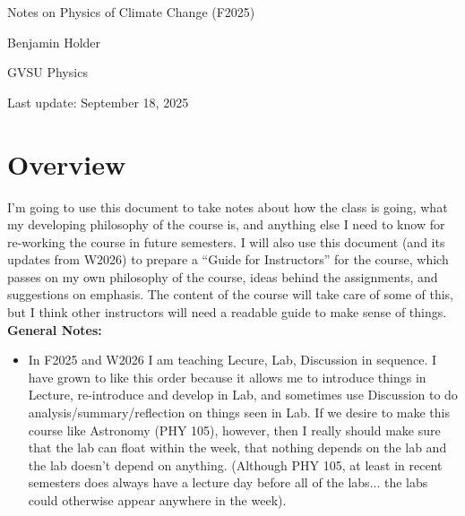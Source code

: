 \documentclass[12pt]{article}
\begin{document}
\begin{titlepage}
    \centering
    \vspace*{\fill}
    {\large Notes on Physics of Climate Change (F2025)\par}
    \vspace{0.5cm}
    {\large Benjamin Holder\par}
    \vspace{1in}
    {\large GVSU Physics\par}
    Last update: September 18, 2025
    \vspace*{\fill}
\end{titlepage}

\section{Overview}


I'm going to use this document to take notes about how the class is going, what my developing philosophy of the course is, and anything else I need to know for re-working the course in future semesters.  I will also use this document (and its updates from W2026) to prepare a ``Guide for Instructors'' for the course, which passes on my own philosophy of the course, ideas behind the assignments, and suggestions on emphasis.  The content of the course will take care of some of this, but I think other instructors will need a readable guide to make sense of things.\\

{\bf General Notes:}
%
\begin{itemize}

\item  In F2025 and W2026 I am teaching Lecure, Lab, Discussion in sequence.  I have grown to like this order because it allows me to introduce things in Lecture, re-introduce and develop in Lab, and sometimes use Discussion to do analysis/summary/reflection on things seen in Lab.  If we desire to make this course like Astronomy (PHY 105), however, then I really should make sure that the lab can float within the week, that nothing depends on the lab and the lab doesn't depend on anything. (Although PHY 105, at least in recent semesters does always have a lecture day before all of the labs... the labs could otherwise appear anywhere in the week).

\end{itemize}
\end{document}
